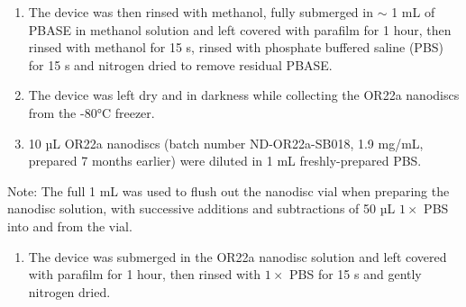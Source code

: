 \documentclass[
  a4paper,
]{scrbook}
\providecommand{\tightlist}{%
  \setlength{\itemsep}{0pt}\setlength{\parskip}{0pt}}\usepackage{longtable,booktabs,array}
\begin{document}
\begin{enumerate}
\def\labelenumi{\arabic{enumi}.}
\setcounter{enumi}{3}
\item
  The device was then rinsed with methanol, fully submerged in \(\sim\)
  1 mL of PBASE in methanol solution and left covered with parafilm for
  1 hour, then rinsed with methanol for 15 s, rinsed with phosphate
  buffered saline (PBS) for 15 s and nitrogen dried to remove residual
  PBASE.
\item
  The device was left dry and in darkness while collecting the OR22a
  nanodiscs from the -80°C freezer.
\item
  10 µL OR22a nanodiscs (batch number ND-OR22a-SB018, 1.9 mg/mL,
  prepared 7 months earlier) were diluted in 1 mL freshly-prepared PBS.
\end{enumerate}

Note: The full 1 mL was used to flush out the nanodisc vial when
preparing the nanodisc solution, with successive additions and
subtractions of 50 µL \(1 \times\) PBS into and from the vial.

\begin{enumerate}
\def\labelenumi{\arabic{enumi}.}
\setcounter{enumi}{6}
\tightlist
\item
  The device was submerged in the OR22a nanodisc solution and left
  covered with parafilm for 1 hour, then rinsed with \(1 \times\) PBS
  for 15 s and gently nitrogen dried.
\end{enumerate}
\end{document}
